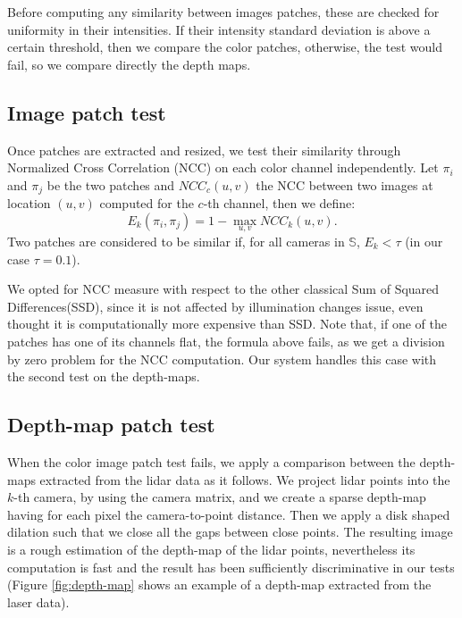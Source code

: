 Before computing any similarity between images patches, these are checked for uniformity in their intensities. If their intensity standard deviation is above a certain threshold, then we compare the color patches, otherwise, the test would fail, so we compare directly the depth maps.

\subsection{Image patch test}%
Once patches are extracted and resized, we test their similarity through Normalized Cross Correlation (NCC) on each color channel independently. 
Let $\pi_i$ and $\pi_j$ be the two patches and $NCC_c(u,v)$ the NCC between two images at location $(u,v)$ computed for the $c$-th channel, then we define:
\begin{equation}
 E_k(\pi_i, \pi_j) = 1 - \max_{u,v}NCC_k(u,v).
\end{equation}
Two patches are considered to be similar if, for all cameras in $\mathbb{S}$, $E_k < \tau$ (in our case $\tau=0.1$). 

We opted for NCC measure with respect to the other classical Sum of Squared Differences(SSD), since it is not affected by illumination changes issue, even thought it is computationally more expensive than SSD. Note that, if one of the patches has one of its channels flat, the formula above fails, as we get a division by zero problem for the NCC computation. Our system handles this case with the second test on the depth-maps. 

\subsection{Depth-map patch test}%
When the color image patch test fails, we apply a comparison between the depth-maps extracted from the lidar data as it follows.
We project lidar points into the $k$-th camera, by using the camera matrix, and we create a sparse depth-map having for each pixel the camera-to-point distance. Then we apply a disk shaped dilation such that we close all the gaps between close points.
The resulting image is a rough estimation of the depth-map of the lidar points, nevertheless its computation is fast and the result has been sufficiently discriminative in our tests (Figure \ref{fig:depth-map} shows an example of a depth-map extracted from the laser data).


